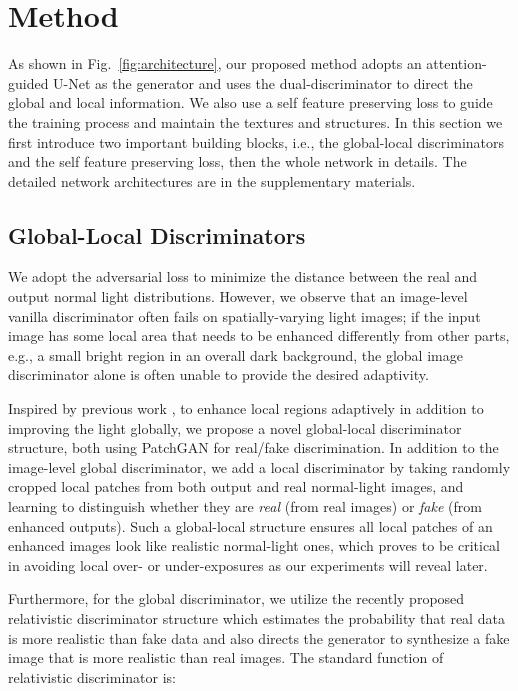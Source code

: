 \documentclass[journal]{IEEEtran}
\begin{document}
\section{Method}
\label{method}
As shown in Fig.~\ref{fig:architecture}, our proposed method adopts an attention-guided U-Net as the generator and uses the dual-discriminator to direct the global and local information. We also use a self feature preserving loss to guide the training process and maintain the textures and structures. In this section we first introduce two important building blocks, i.e., the global-local discriminators and the self feature preserving loss, then the whole network in details. The detailed network architectures are in the supplementary materials.

\subsection{Global-Local Discriminators}
We adopt the adversarial loss to minimize the distance between the real and output normal light distributions. However, we observe that an image-level vanilla discriminator often fails on spatially-varying light images; if the input image has some local area that needs to be enhanced differently from other parts, e.g., a small bright region in an overall dark background, the global image discriminator alone is often unable to provide the desired adaptivity. 

Inspired by previous work \cite{yu2018generative}, to enhance local regions adaptively in addition to improving the light globally, we propose a novel global-local discriminator structure, both using PatchGAN for real/fake discrimination. In addition to the image-level global discriminator, we add a local discriminator by taking randomly cropped local patches from both output and real normal-light images, and learning to distinguish whether they are \textit{real} (from real images) or \textit{fake} (from enhanced outputs). Such a global-local structure ensures all local patches of an enhanced images look like realistic normal-light ones, which proves to be critical in avoiding local over- or under-exposures as our experiments will reveal later.



Furthermore, for the global discriminator, 
we utilize the recently proposed relativistic discriminator structure \cite{jolicoeur2018relativistic} which estimates the probability that real data is more realistic than fake data and also directs the generator to synthesize a fake image that is more realistic than real images. The standard function of relativistic discriminator is:
\end{document}
